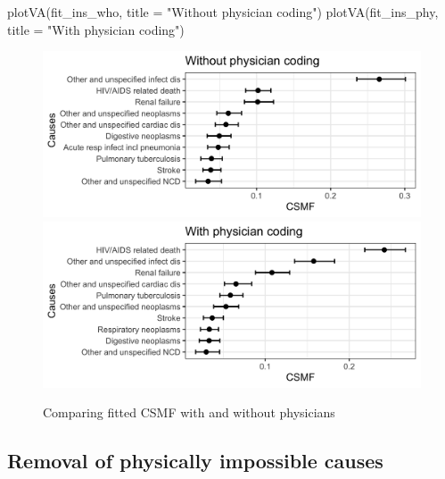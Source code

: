 \begin{Schunk}
\begin{Sinput}
plotVA(fit_ins_who, title = "Without physician coding")
plotVA(fit_ins_phy, title = "With physician coding")
\end{Sinput}
\begin{figure}[!h]

{\centering \includegraphics[width=1\linewidth,]{openVA-RJ-R1_files/figure-latex/phy3-1} \includegraphics[width=1\linewidth,]{openVA-RJ-R1_files/figure-latex/phy3-2} 

}

\caption[Comparing fitted CSMF with and without physicians]{Comparing fitted CSMF with and without physicians}\label{fig:phy3}
\end{figure}
\end{Schunk}

\hypertarget{removal-of-physically-impossible-causes}{%
\subsection{Removal of physically impossible
causes}\label{removal-of-physically-impossible-causes}}


